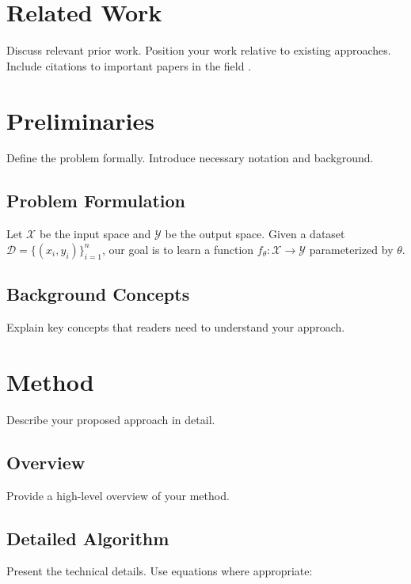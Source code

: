 \documentclass{article}
\begin{document}
\section{Related Work}
\label{sec:related_work}

Discuss relevant prior work. Position your work relative to existing approaches.
Include citations to important papers in the field \citep{author2024paper}.

\section{Preliminaries}
\label{sec:preliminaries}

Define the problem formally. Introduce necessary notation and background.

\subsection{Problem Formulation}

Let $\mathcal{X}$ be the input space and $\mathcal{Y}$ be the output space.
Given a dataset $\mathcal{D} = \{(x_i, y_i)\}_{i=1}^{n}$, our goal is to learn
a function $f_\theta: \mathcal{X} \rightarrow \mathcal{Y}$ parameterized by $\theta$.

\subsection{Background Concepts}

Explain key concepts that readers need to understand your approach.

\section{Method}
\label{sec:method}

Describe your proposed approach in detail.

\subsection{Overview}

Provide a high-level overview of your method.

\subsection{Detailed Algorithm}

Present the technical details. Use equations where appropriate:
\end{document}
